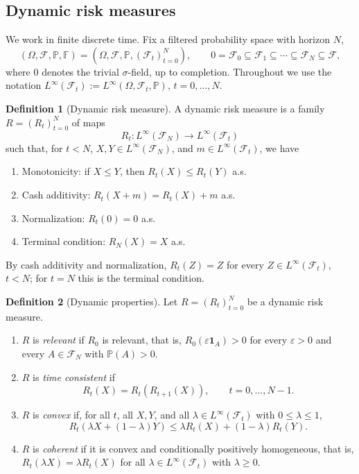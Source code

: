 \documentclass[a4paper]{amsart}
\theoremstyle{definition}
\newtheorem{definition}[definition]{Definition}
\newcommand{\FF}{\mathbb{F}}
\newcommand{\F}{\mathcal{F}}
\renewcommand{\subset}{\subseteq}
\renewcommand{\P}{\mathbb{P}}
\begin{document}
\subsection{Dynamic risk measures}

We work in finite discrete time. Fix a filtered probability space with horizon
\(N\),
\[
(\Omega,\F,\P,\FF)
=
(\Omega,\F,\P,(\F_t)_{t=0}^N),
\qquad
0=\F_0\subset\F_1\subset\cdots\subset\F_N\subset\F,
\]
where \(0\) denotes the trivial \(\sigma\)-field, up to completion. Throughout we use the notation $L^\infty(\F_t):= L^\infty(\Omega,\F_t,\P)$, $t = 0, \ldots, N$. 

\begin{definition}[Dynamic risk measure]
\label{def:dynamic-risk}
A dynamic risk measure is a family
\(R=(R_t)_{t=0}^N\) of maps
\[
R_t:L^\infty(\F_N)\to L^\infty(\F_t)
\]
such that, for \(t<N\), \(X,Y\in L^\infty(\F_N)\), and
\(m\in L^\infty(\F_t)\), we have

\begin{enumerate}[(1)]
\item Monotonicity: if \(X\le Y\), then \(R_t(X)\le R_t(Y)\) a.s.

\item Cash additivity: \(R_t(X+m)=R_t(X)+m\) a.s.

\item Normalization: \(R_t(0)=0\) a.s.

\item Terminal condition: \(R_N(X)=X\) a.s.
\end{enumerate}
\end{definition}

By cash additivity and normalization, \(R_t(Z)=Z\) for every
\(Z\in L^\infty(\F_t)\), \(t<N\); for \(t=N\) this is the terminal
condition.

\begin{definition}[Dynamic properties]
\label{def:dynamic-properties}
Let \(R=(R_t)_{t=0}^N\) be a dynamic risk measure.

\begin{enumerate}[(1)]
\item \(R\) is \emph{relevant} if \(R_0\) is relevant, that is,
\(R_0(\varepsilon\mathbf 1_A)>0\) for every \(\varepsilon>0\) and every
\(A\in\F_N\) with \(\P(A)>0\).

\item \(R\) is \emph{time consistent} if
\[
R_t(X)=R_t(R_{t+1}(X)),
\qquad t=0,\dots,N-1.
\]

\item \(R\) is \emph{convex} if, for all \(t\), all \(X,Y\), and all
\(\lambda\in L^\infty(\F_t)\) with \(0\le\lambda\le1\),
\[
R_t(\lambda X+(1-\lambda)Y)
\le
\lambda R_t(X)+(1-\lambda)R_t(Y).
\]

\item \(R\) is \emph{coherent} if it is convex and conditionally positively
homogeneous, that is,
\(R_t(\lambda X)=\lambda R_t(X)\) for all
\(\lambda\in L^\infty(\F_t)\) with \(\lambda\ge0\).
\end{enumerate}
\end{definition}
\end{document}
